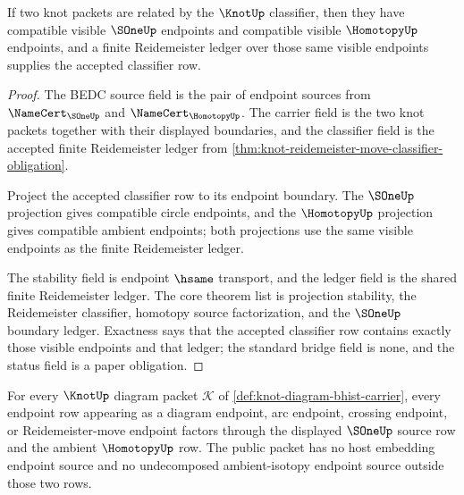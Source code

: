 \begin{theorem}\label{thm:knot-ambient-isotopy-ledger-exactness}
If two knot packets are related by the $\KnotUp$ classifier, then they have compatible visible $\SOneUp$ endpoints and compatible visible $\HomotopyUp$ endpoints, and a finite Reidemeister ledger over those same visible endpoints supplies the accepted classifier row.
\end{theorem}

\begin{proof}
The BEDC source field is the pair of endpoint sources from $\NameCert_{\SOneUp}$ and $\NameCert_{\HomotopyUp}$. The carrier field is the two knot packets together with their displayed boundaries, and the classifier field is the accepted finite Reidemeister ledger from \autoref{thm:knot-reidemeister-move-classifier-obligation}.

Project the accepted classifier row to its endpoint boundary. The $\SOneUp$ projection gives compatible circle endpoints, and the $\HomotopyUp$ projection gives compatible ambient endpoints; both projections use the same visible endpoints as the finite Reidemeister ledger.

The stability field is endpoint $\hsame$ transport, and the ledger field is the shared finite Reidemeister ledger. The core theorem list is projection stability, the Reidemeister classifier, homotopy source factorization, and the $\SOneUp$ boundary ledger. Exactness says that the accepted classifier row contains exactly those visible endpoints and that ledger; the standard bridge field is none, and the status field is a paper obligation.
\end{proof}

\begin{theorem}\label{thm:knot-endpoint-source-exhaustion}
For every $\KnotUp$ diagram packet $\mathcal{K}$ of
\autoref{def:knot-diagram-bhist-carrier}, every endpoint row appearing as a
diagram endpoint, arc endpoint, crossing endpoint, or Reidemeister-move
endpoint factors through the displayed $\SOneUp$ source row and the ambient
$\HomotopyUp$ row. The public packet has no host embedding endpoint source
and no undecomposed ambient-isotopy endpoint source outside those two rows.
\end{theorem}

